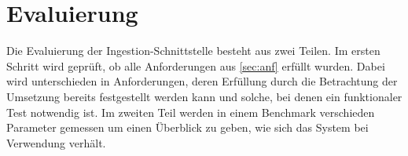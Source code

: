 \chapter{Evaluierung}

Die Evaluierung der Ingestion-Schnittstelle besteht aus zwei Teilen.
Im ersten Schritt wird geprüft, ob alle Anforderungen aus \cref{sec:anf} erfüllt wurden.
Dabei wird unterschieden in Anforderungen, deren Erfüllung durch die Betrachtung der Umsetzung bereits festgestellt werden kann und solche, bei denen ein funktionaler Test notwendig ist.
Im zweiten Teil werden in einem Benchmark verschieden Parameter gemessen um einen Überblick zu geben, wie sich das System bei Verwendung verhält.



